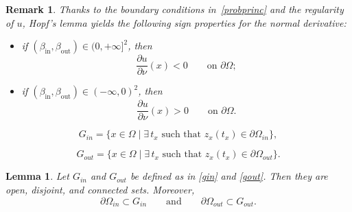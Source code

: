 \documentclass[10pt,a4paper]{amsart}
\newtheorem{oss}{Remark}
\newtheorem{lemma}{Lemma}
\begin{document}
\begin{oss}\label{hopf}
Thanks to the boundary conditions in~\eqref{probprinc} and the regularity of $u$,
Hopf's lemma yields the following sign properties for the normal derivative:
\begin{itemize}
    \item if $(\beta_{\mathrm{in}}, \beta_{\mathrm{out}}) \in (0,+\infty]^2$, then
    \[
    \frac{\partial u}{\partial \nu}(x) < 0
    \qquad \text{on } \partial \Omega;
    \]
    \item if $(\beta_{\mathrm{in}}, \beta_{\mathrm{out}}) \in (-\infty,0)^2$, then
    \[
    \frac{\partial u}{\partial \nu}(x) > 0
    \qquad \text{on } \partial \Omega.
    \]
\end{itemize}
\end{oss}

\begin{equation}
\label{gin}
    G_{in} = \{ x \in \Omega \mid \exists\, t_x \text{ such that } z_x(t_x) \in \partial \Omega_{in} \},
\end{equation}

\begin{equation}
\label{gout}
    G_{out} = \{ x \in \Omega \mid \exists\, t_x \text{ such that } z_x(t_x) \in \partial \Omega_{out} \}.
\end{equation}

\begin{lemma}\label{G_aperti}
Let $G_{in}$ and $G_{out}$ be defined as in \eqref{gin} and \eqref{gout}. Then they are open, disjoint, and connected sets.
Moreover,
\[
\partial \Omega_{in} \subset G_{in}
\qquad \text{and} \qquad
\partial \Omega_{out} \subset G_{out}.
\]
\end{lemma}
\end{document}
